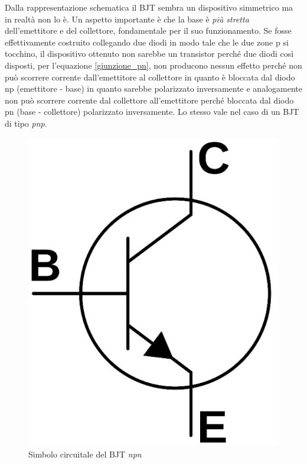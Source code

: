 \documentclass[12pt, a4paper]{report}
\begin{document}
Dalla rappresentazione schematica il BJT sembra un dispositivo simmetrico ma in realtà non lo è. Un aspetto importante è che la base è \textit{più stretta} dell'emettitore e del collettore, fondamentale per il suo funzionamento. Se fosse effettivamente costruito collegando due diodi in modo tale che le due zone p si tocchino, il dispositivo ottenuto non sarebbe un transistor perché due diodi così disposti, per l'equazione \eqref{giunzione_pn}, non producono nessun effetto perché non può scorrere corrente dall'emettitore al collettore in quanto è bloccata dal diodo np (emettitore - base) in quanto sarebbe polarizzato inversamente e analogamente non può scorrere corrente dal collettore all'emettitore perché bloccata dal diodo pn (base - collettore) polarizzato inversamente. Lo stesso vale nel caso di un BJT di tipo \textit{pnp}.
\begin{figure}[h]
    \centering
    \includegraphics[scale=0.3,angle=0]{bjt_simbolo.png}
    \caption{Simbolo circuitale del BJT \textit{npn}}
\end{figure}
\end{document}

